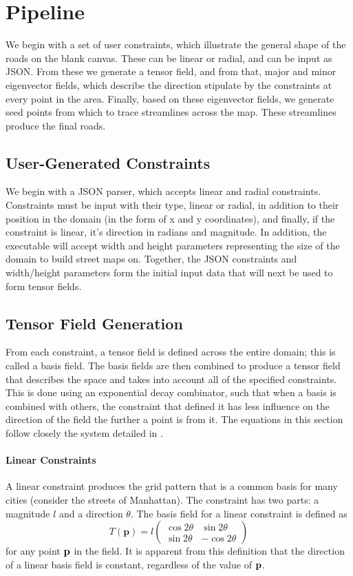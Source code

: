 \documentclass[twocolumn]{article}
\newcommand{\sqmat}[4]{\ensuremath{
    \left(\begin{array}{cc}
        #1 & #2 \\
        #3 & #4
    \end{array}\right)}}
\newcommand{\pt}{\textbf{p}}
\newcommand{\todo}[1]{\begin{center}\fbox{\parbox{150pt}{#1}}\end{center}}
\begin{document}
\section{Pipeline}
We begin with a set of user constraints, which illustrate the general shape of
the roads on the blank canvas. These can be linear or radial, and can be input
as JSON. From these we generate a tensor field, and from that, major and minor
eigenvector fields, which describe the direction stipulate by the constraints at
every point in the area. Finally, based on these eigenvector fields, we generate
seed points from which to trace streamlines across the map. These streamlines
produce the final roads.

\todo{insert pipeline diagram}

\subsection{User-Generated Constraints}
We begin with a JSON parser, which accepts linear and radial constraints.
Constraints must be input with their type, linear or radial, in addition to
their position in the domain (in the form of x and y coordinates), and finally,
if the constraint is linear, it’s direction in radians and magnitude. In
addition, the executable will accept width and height parameters representing
the size of the domain to build street maps on. Together, the JSON constraints
and width/height parameters form the initial input data that will next be used
to form tensor fields.

\subsection{Tensor Field Generation}
From each constraint, a tensor field is defined across the entire domain; this
is called a basis field. The basis fields are then combined to produce a tensor
field that describes the space and takes into account all of the specified
constraints. This is done using an exponential decay combinator, such that when
a basis is combined with others, the constraint that defined it has less
influence on the direction of the field the further a point is from it. The
equations in this section follow closely the system detailed in \cite{chen}.

\paragraph{Linear Constraints}
A linear constraint produces the grid pattern that is a common basis for many
cities (consider the streets of Manhattan). The constraint has two parts: a
magnitude $l$ and a direction $\theta$. The basis field for a linear constraint
is defined as
\[
    T(\pt) =
        l\sqmat{\cos{2\theta}}{\sin{2\theta}}{\sin{2\theta}}{-\cos{2\theta}}
\]
for any point $\bf p$ in the field. It is apparent from this definition that
the direction of a linear basis field is constant, regardless of the value of
$\bf p$.
\end{document}
